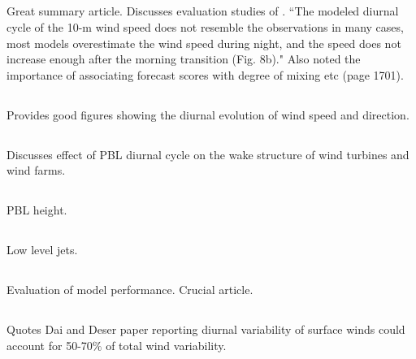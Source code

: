 \documentclass{article}
\begin{document}
\subsection{\citet{holtslag13}}
Great summary article. Discusses evaluation studies of \citet{svensson11}. ``The modeled diurnal cycle of the 10-m wind speed does not resemble the observations in many cases, most models overestimate the wind speed during night, and the speed does not increase enough after the morning transition (Fig. 8b)." Also noted the importance of associating forecast scores with degree of mixing etc (page 1701). 

\subsection{\citet{hoxit75}}
Provides good figures showing the diurnal evolution of wind speed and direction. 

\subsection{\citet{englberger18}}
Discusses effect of PBL diurnal cycle on the wake structure of wind turbines and wind farms. 

\subsection{\citet{liu10}}
PBL height. 

\subsection{\citet{stensrud96}}
Low level jets. 

\subsection{\citet{svensson11}}
Evaluation of model performance. Crucial article. 

\subsection{\citet{zhang04}}
Quotes Dai and Deser paper reporting diurnal variability of surface winds could account for 50-70$\%$ of total wind variability. 
\end{document}
